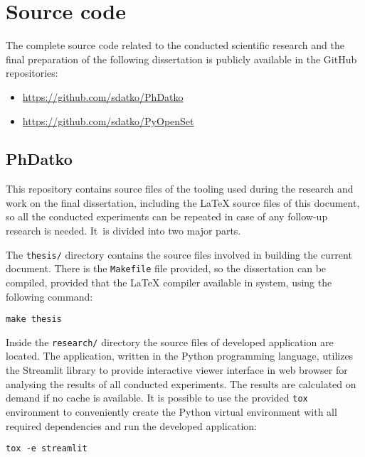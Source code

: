 \chapter{Source code}
\label{chapter:source-code}

The complete source code related to the conducted scientific research and the final preparation of the following dissertation is publicly available in the GitHub repositories:
\begin{itemize}
    \item \url{https://github.com/sdatko/PhDatko}
    \item \url{https://github.com/sdatko/PyOpenSet}
\end{itemize}


\section{PhDatko}
\label{section:phdatko}

This repository contains source files of the tooling used during the research and work on the final dissertation, including the \LaTeX{} source files of this document, so all the conducted experiments can be repeated in case of any follow-up research is needed. It~is divided into two major parts.

The \texttt{thesis/} directory contains the source files involved in building the current document. There is the \texttt{Makefile} file provided, so the dissertation can be compiled, provided that the \LaTeX{} compiler available in system, using the following command:
\vspace{-\parskip}
\begin{verbatim}
make thesis
\end{verbatim}

Inside the \texttt{research/} directory the source files of developed application are located. The application, written in the Python programming language, utilizes the Streamlit library to provide interactive viewer interface in web browser for analysing the results of all conducted experiments. The results are calculated on demand if no cache is available. It is possible to use the provided \texttt{tox} environment to conveniently create the Python virtual environment with all required dependencies and run the developed application:
\vspace{-\parskip}
\begin{verbatim}
tox -e streamlit
\end{verbatim}


